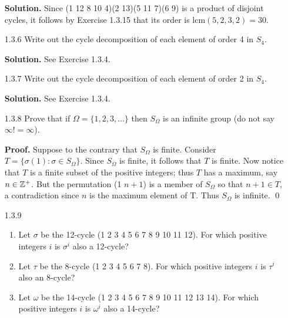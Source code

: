 \begin{enumerate}
      \textbf{Solution.} Since (1 12 8 10 4)(2 13)(5 11 7)(6 9) is a product of
      disjoint cycles, it follows by Exercise 1.3.15 that its order is
      lcm$(5, 2, 3, 2) = 30$.
   \item[1.3.6]   Write out the cycle decomposition of each element of order 4
                  in $S_4$.

      \textbf{Solution.} See Exercise 1.3.4.
   \item[1.3.7]   Write out the cycle decomposition of each element of order 2
                  in $S_4$.

      \textbf{Solution.} See Exercise 1.3.4.
   \item[1.3.8]   Prove that if $\Omega = \{1, 2, 3, \ldots\}$ then $S_\Omega$
                  is an infinite group (do not say $\infty! = \infty$).

      \textbf{Proof.} Suppose to the contrary that $S_\Omega$ is finite.
      Consider $T = \{\sigma(1) : \sigma \in S_\Omega\}$. Since $S_\Omega$ is
      finite, it follows that $T$ is finite. Now notice that $T$ is a finite
      subset of the positive integers; thus $T$ has a maximum, say $n \in \mathbb{Z}^+$.
      But the permutation (1 \; $n+1$) is a member of $S_\Omega$ so that
      $n + 1 \in T$, a contradiction since $n$ is the maximum element of T. Thus
      $S_\Omega$ is infinite. \qed
   \item[1.3.9]   \begin{enumerate}
                     \item Let $\sigma$ be the 12-cycle
                           (1 2 3 4 5 6 7 8 9 10 11 12). For which positive
                           integers $i$ is $\sigma^i$ also a 12-cycle?
                     \item Let $\tau$ be the 8-cycle (1 2 3 4 5 6 7 8). For
                           which positive integers $i$ is $\tau^i$ also an
                           8-cycle?
                     \item Let $\omega$ be the 14-cycle
                           (1 2 3 4 5 6 7 8 9 10 11 12 13 14). For which
                           positive integers $i$ is $\omega^i$ also a 14-cycle?
                  \end{enumerate}


\end{enumerate}

